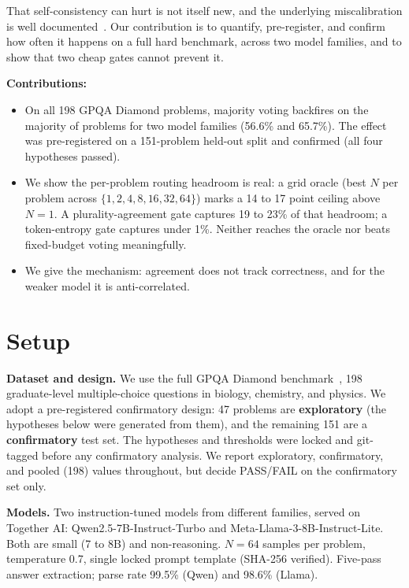 \documentclass{article}
\begin{document}
That self-consistency can hurt is not itself new, and the underlying
miscalibration is well documented~\citep{guo2017calibration,
kadavath2022language}. Our contribution is to quantify, pre-register, and
confirm how often it happens on a full hard benchmark, across two model
families, and to show that two cheap gates cannot prevent it.

\textbf{Contributions:}
\begin{itemize}
  \item On all 198 GPQA Diamond problems, majority voting backfires on the
        majority of problems for two model families (56.6\% and 65.7\%). The
        effect was pre-registered on a 151-problem held-out split and confirmed
        (all four hypotheses passed).
  \item We show the per-problem routing headroom is real: a grid oracle (best
        $N$ per problem across $\{1,2,4,8,16,32,64\}$) marks a 14 to 17 point
        ceiling above $N=1$. A plurality-agreement gate captures 19 to 23\% of
        that headroom; a token-entropy gate captures under 1\%. Neither reaches
        the oracle nor beats fixed-budget voting meaningfully.
  \item We give the mechanism: agreement does not track correctness, and for
        the weaker model it is anti-correlated.
\end{itemize}

\section{Setup}

\textbf{Dataset and design.} We use the full GPQA Diamond
benchmark~\citep{rein2023gpqa}, 198 graduate-level multiple-choice questions
in biology, chemistry, and physics. We adopt a pre-registered confirmatory
design: 47 problems are \textbf{exploratory} (the hypotheses below were
generated from them), and the remaining 151 are a \textbf{confirmatory} test
set. The hypotheses and thresholds were locked and git-tagged before any
confirmatory analysis. We report exploratory, confirmatory, and pooled (198)
values throughout, but decide PASS/FAIL on the confirmatory set only.

\textbf{Models.} Two instruction-tuned models from different families, served
on Together AI: Qwen2.5-7B-Instruct-Turbo and Meta-Llama-3-8B-Instruct-Lite.
Both are small (7 to 8B) and non-reasoning. $N=64$ samples per problem,
temperature 0.7, single locked prompt template (SHA-256 verified). Five-pass
answer extraction; parse rate 99.5\% (Qwen) and 98.6\% (Llama).
\end{document}
